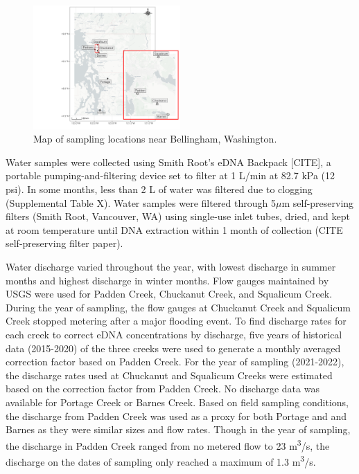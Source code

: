 \documentclass[
]{article}
\begin{document}
\begin{figure}
\centering
\includegraphics[width=0.5\textwidth,height=\textheight]{../Output/Figures/SiteMap.png}
\caption{Map of sampling locations near Bellingham, Washington.}
\end{figure}

Water samples were collected using Smith Root's eDNA Backpack
{[}CITE{]}, a portable pumping-and-filtering device set to filter at 1
L/min at 82.7 kPa (12 psi). In some months, less than 2 L of water was
filtered due to clogging (Supplemental Table X). Water samples were
filtered through 5\(\mu\)m self-preserving filters (Smith Root,
Vancouver, WA) using single-use inlet tubes, dried, and kept at room
temperature until DNA extraction within 1 month of collection (CITE
self-preserving filter paper).

Water discharge varied throughout the year, with lowest discharge in
summer months and highest discharge in winter months. Flow gauges
maintained by USGS were used for Padden Creek, Chuckanut Creek, and
Squalicum Creek. During the year of sampling, the flow gauges at
Chuckanut Creek and Squalicum Creek stopped metering after a major
flooding event. To find discharge rates for each creek to correct eDNA
concentrations by discharge, five years of historical data (2015-2020)
of the three creeks were used to generate a monthly averaged correction
factor based on Padden Creek. For the year of sampling (2021-2022), the
discharge rates used at Chuckanut and Squalicum Creeks were estimated
based on the correction factor from Padden Creek. No discharge data was
available for Portage Creek or Barnes Creek. Based on field sampling
conditions, the discharge from Padden Creek was used as a proxy for both
Portage and and Barnes as they were similar sizes and flow rates. Though
in the year of sampling, the discharge in Padden Creek ranged from no
metered flow to 23 m\textsuperscript{3}/s, the discharge on the dates of
sampling only reached a maximum of 1.3 m\textsuperscript{3}/s.
\end{document}

